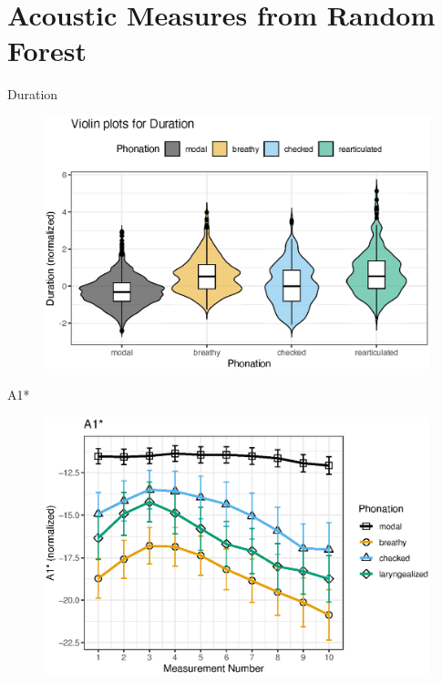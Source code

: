 \documentclass[professionalfonts]{beamer}
\begin{document}
\section{Acoustic Measures from Random Forest}


\begin{frame}{Duration}
  \begin{figure}
    \centering
    \includegraphics[width = 0.8\linewidth]{images/duration_plot.eps}
  \end{figure}
\end{frame}

\begin{frame}{A1*}
  \begin{figure}
    \centering
    \includegraphics[width = 0.8\linewidth]{images/slz_a1c.eps}
  \end{figure}
\end{frame}
\end{document}
